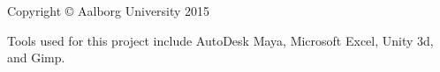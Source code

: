 \thispagestyle{empty}
{\small
\strut\vfill %
\noindent Copyright \copyright{} Aalborg University 2015\par
\vspace{0.2cm}
\noindent Tools used for this project include AutoDesk Maya, Microsoft Excel, Unity 3d, and Gimp.
}
\clearpage

